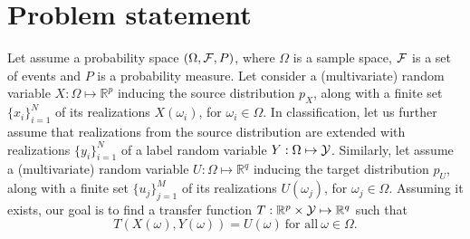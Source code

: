 \documentclass{article}
\begin{document}




\section{Problem statement}

Let assume a probability space $(\Omega, {\cal F}, P)$, where $\Omega$ is a
sample space, ${\cal F}$ is a set of events and $P$ is a probability measure.
Let consider a (multivariate) random variable $X: \Omega \mapsto
\mathbb{R}^p$ inducing the source distribution $p_X$, along with a
finite set $\{x_i\}_{i=1}^N$ of its realizations $X(\omega_i)$, for $\omega_i
\in \Omega$.
In classification,
let us further assume that realizations from the source distribution are extended with realizations $\{y_i\}_{i=1}^N$
of a label random variable $Y:\Omega \mapsto {\cal Y}$.
Similarly, let assume a (multivariate) random variable $U: \Omega
\mapsto \mathbb{R}^q$ inducing the target distribution $p_U$, along with a finite set
$\{u_j\}_{j=1}^M$ of its realizations $U(\omega_j)$, for $\omega_j \in \Omega$.
Assuming it exists, our goal is to find a transfer function $T: \mathbb{R}^p \times {\cal Y}
\mapsto \mathbb{R}^q$ such that
\begin{equation}\label{eqn:tf}
T(X(\omega), Y(\omega)) = U(\omega) ~\text{for all}~ \omega \in \Omega.
\end{equation}
\end{document}
